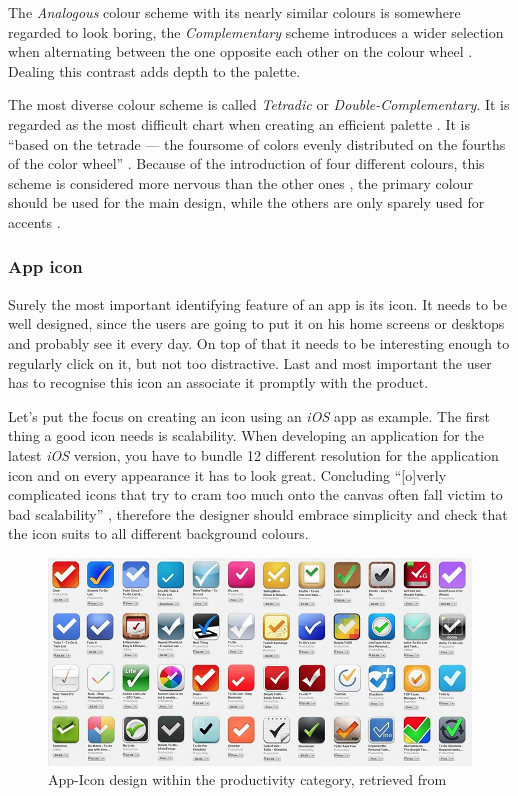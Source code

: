 The \emph{Analogous} colour scheme with its nearly similar colours is somewhere regarded to look boring, the \emph{Complementary} scheme introduces a wider selection when alternating between the one opposite each other on the colour wheel \cite{Chapman:2010ab}. Dealing this contrast adds depth to the palette.

The most diverse colour scheme is called \emph{Tetradic} or \emph{Double-Complementary}. It is regarded as the most difficult chart when creating an efficient palette \cite{Chapman:2010ab}. It is \enquote{based on the tetrade — the foursome of colors evenly distributed on the fourths of the color wheel} \cite{Stanicek:2011aa}. Because of the introduction of four different colours, this scheme is considered more nervous than the other ones \cite{Stanicek:2011aa}, the primary colour should be used for the main design, while the others are only sparely used for accents \cite{Chapman:2010ab}.

\subsubsection{App icon}
\label{sec:Icon}
Surely the most important identifying feature of an app is its icon. It needs to be well designed, since the users are going to put it on his home screens or desktops and probably see it every day. On top of that it needs to be interesting enough to regularly click on it, but not too distractive. Last and most important the user has to recognise this icon an associate it promptly with the product. \cite{Flarup:2015aa}

Let's put the focus on creating an icon using an \emph{iOS} app as example. The first thing a good icon needs is scalability. When developing an application for the latest \emph{iOS} version, you have to bundle 12 different resolution for the application icon and on every appearance it has to look great. Concluding \enquote{[o]verly complicated icons that try to cram too much onto the canvas often fall victim to bad scalability} \cite{Flarup:2015aa}, therefore the designer should embrace simplicity and check that the icon suits to all different background colours. \cite{Flarup:2015aa}

\begin{figure}[h]
  	\centering
  	\includegraphics[width=0.7\linewidth]{./images/productivity-icons.png}
  	\caption{App-Icon design within the productivity category, retrieved from \cite{Flarup:2015aa}}
	\label{fig:AppProd}
\end{figure}
\nocite{Flarup:2015aa}

